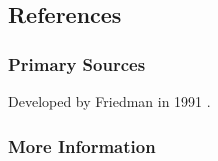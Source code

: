 \subsection{References}

\subsubsection{Primary Sources}

Developed by Friedman in 1991 \cite{Friedman1991}.

\subsubsection{More Information}





